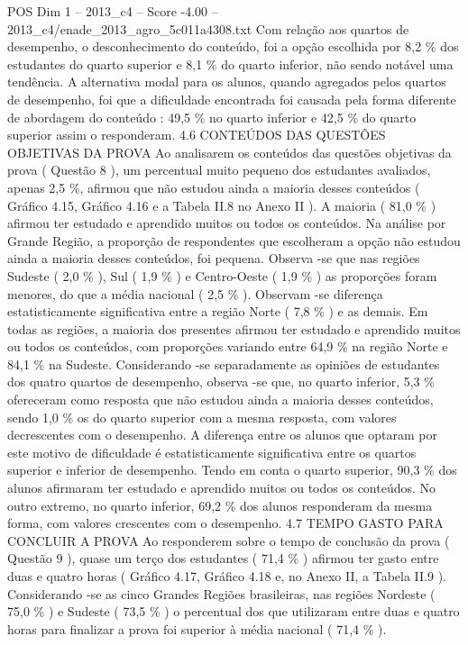 \begin{textsample}{POS Dim 1 – 2013\_c4 – Score -4.00 – 2013\_c4/enade\_2013\_agro\_5c011a4308.txt}
Com relação aos quartos de desempenho, o desconhecimento do conteúdo, foi a opção escolhida por 8,2 \% dos estudantes do quarto superior e 8,1 \% do quarto inferior, não sendo notável uma tendência.
A alternativa modal para os alunos, quando agregados pelos quartos de desempenho, foi que a dificuldade encontrada foi causada pela forma diferente de abordagem do conteúdo : 49,5 \% no quarto inferior e 42,5 \% do quarto superior assim o responderam. 4.6 CONTEÚDOS DAS QUESTÕES OBJETIVAS DA PROVA Ao analisarem os conteúdos das questões objetivas da prova ( Questão 8 ), um percentual muito pequeno dos estudantes avaliados, apenas 2,5 \%, afirmou que não estudou ainda a maioria desses conteúdos ( Gráfico 4.15, Gráfico 4.16 e a Tabela II.8 no Anexo II ).
A maioria ( 81,0 \% ) afirmou ter estudado e aprendido muitos ou todos os conteúdos.
Na análise por Grande Região, a proporção de respondentes que escolheram a opção não estudou ainda a maioria desses conteúdos, foi pequena.
Observa -se que nas regiões Sudeste ( 2,0 \% ), Sul ( 1,9 \% ) e Centro-Oeste ( 1,9 \% ) as proporções foram menores, do que a média nacional ( 2,5 \% ).
Observam -se diferença estatisticamente significativa entre a região Norte ( 7,8 \% ) e as demais.
Em todas as regiões, a maioria dos presentes afirmou ter estudado e aprendido muitos ou todos os conteúdos, com proporções variando entre 64,9 \% na região Norte e 84,1 \% na Sudeste.
Considerando -se separadamente as opiniões de estudantes dos quatro quartos de desempenho, observa -se que, no quarto inferior, 5,3 \% ofereceram como resposta que não estudou ainda a maioria desses conteúdos, sendo 1,0 \% os do quarto superior com a mesma resposta, com valores decrescentes com o desempenho.
A diferença entre os alunos que optaram por este motivo de dificuldade é estatisticamente significativa entre os quartos superior e inferior de desempenho.
Tendo em conta o quarto superior, 90,3 \% dos alunos afirmaram ter estudado e aprendido muitos ou todos os conteúdos.
No outro extremo, no quarto inferior, 69,2 \% dos alunos responderam da mesma forma, com valores crescentes com o desempenho. 4.7 TEMPO GASTO PARA CONCLUIR A PROVA Ao responderem sobre o tempo de conclusão da prova ( Questão 9 ), quase um terço dos estudantes ( 71,4 \% ) afirmou ter gasto entre duas e quatro horas ( Gráfico 4.17, Gráfico 4.18 e, no Anexo II, a Tabela II.9 ).
Considerando -se as cinco Grandes Regiões brasileiras, nas regiões Nordeste ( 75,0 \% ) e Sudeste ( 73,5 \% ) o percentual dos que utilizaram entre duas e quatro horas para finalizar a prova foi superior à média nacional ( 71,4 \% ).

\end{textsample}
